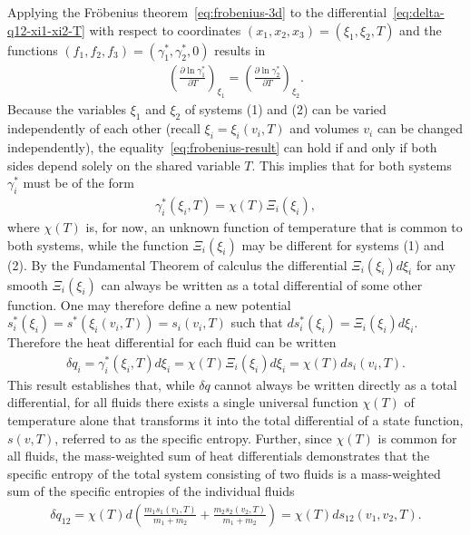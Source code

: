 Applying the Fröbenius theorem~\eqref{eq:frobenius-3d} to the differential~\eqref{eq:delta-q12-xi1-xi2-T} with respect to coordinates $(x_1,x_2,x_3)=(\xi_1,\xi_2,T)$ and the functions $(f_1,f_2,f_3)=(\gamma_1^\ast,\gamma_2^\ast,0)$ results in
\begin{align}\label{eq:frobenius-result}
    \left(\frac{\partial \ln\gamma_1^\ast}{\partial T}\right)_{\xi_1}=\left(\frac{\partial \ln\gamma_2^\ast}{\partial T}\right)_{\xi_2}.
\end{align}
Because the variables $\xi_1$ and $\xi_2$ of systems (1) and (2) can be varied independently of each other (recall $\xi_i=\xi_i(v_i,T)$ and volumes $v_i$ can be changed independently), the equality~\eqref{eq:frobenius-result} can hold if and only if both sides depend solely on the shared variable $T$. This implies that for both systems $\gamma^\ast_i$ must be of the form
\begin{align}
    \gamma^\ast_i(\xi_i,T)=\chi(T)\Xi_i(\xi_i),
\end{align}
where $\chi(T)$ is, for now, an unknown function of temperature that is common to both systems, while the function $\Xi_i(\xi_i)$ may be different for systems (1) and (2). By the Fundamental Theorem of calculus the differential $\Xi_i(\xi_i)d\xi_i$ for any smooth $\Xi_i(\xi_i)$ can always be written as a total differential of some other function. One may therefore define a new potential $s_i^\ast(\xi_i)=s^\ast(\xi_i(v_i,T))=s_i(v_i,T)$ such that $ds_i^\ast(\xi_i)=\Xi_i(\xi_i)d\xi_i$. Therefore the heat differential for each fluid can be written
\begin{align}
    \delta q_i = \gamma_i^\ast(\xi_i,T) d\xi_i=\chi(T)\Xi_i(\xi_i)d\xi_i=\chi(T) ds_i(v_i,T).
\end{align}
This result establishes that, while $\delta q$ cannot always be written directly as a total differential, for all fluids there exists a single universal function $\chi(T)$ of temperature alone that transforms it into the total differential of a state function, $s(v,T)$, referred to as the specific entropy. Further, since $\chi(T)$ is common for all fluids, the mass-weighted sum of heat differentials demonstrates that the specific entropy of the total system consisting of two fluids is a mass-weighted sum of the specific entropies of the individual fluids
\begin{align}
    \delta q_{12}=\chi(T)d\left(\frac{m_1s_1(v_1,T)}{m_1+m_2}+\frac{m_2s_2(v_2,T)}{m_1+m_2}\right)=\chi(T)ds_{12}(v_1,v_2,T).
\end{align}

